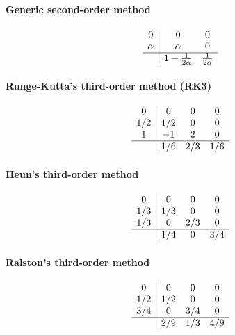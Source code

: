 \paragraph{Generic second-order method}

\begin{equation}
	\begin{array}{c|cc}
		0      & 0      & 0 \\
		\alpha & \alpha & 0 \\ \hline
		       & 1-\frac{1}{2\alpha} & \frac{1}{2\alpha}
	\end{array}
	\label{eq::generic_second}
\end{equation}

\paragraph{Runge-Kutta's third-order method (RK3)}

\begin{equation}
	\begin{array}
	{c|ccc}
		0   &  0  & 0   & 0 \\
		1/2 & 1/2 & 0   & 0 \\
		1   & -1  & 2   & 0 \\ \hline
		    & 1/6 & 2/3 & 1/6
	\end{array}
		\label{eq::RK3}
\end{equation}

\paragraph{Heun's third-order method}

\begin{equation}
	\begin{array}{c|ccc}
		0   & 0   & 0   & 0 \\
		1/3 & 1/3 & 0   & 0 \\
		1/3 & 0   & 2/3 & 0 \\ \hline
		    & 1/4 & 0   & 3/4
	\end{array}
	\label{eq::heun3}
\end{equation}

\paragraph{Ralston's third-order method}

\begin{equation}
	\begin{array}{c|ccc}
		0   & 0   & 0   & 0 \\
		1/2 & 1/2 & 0   & 0 \\
		3/4 & 0   & 3/4 & 0 \\ \hline
		    & 2/9 & 1/3 & 4/9
	\end{array}
	\label{eq::ralston3}
\end{equation}

